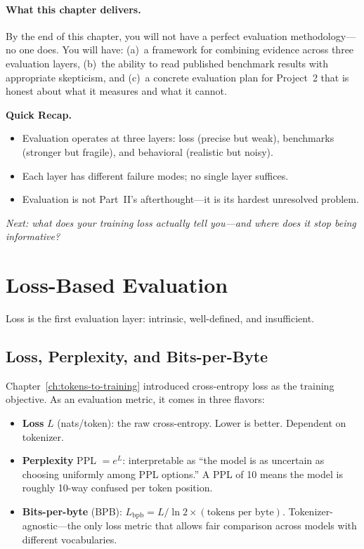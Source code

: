 \paragraph{What this chapter delivers.} By the end of this chapter, you will not have a perfect evaluation methodology---no one does. You will have: (a)~a framework for combining evidence across three evaluation layers, (b)~the ability to read published benchmark results with appropriate skepticism, and (c)~a concrete evaluation plan for Project~2 that is honest about what it measures and what it cannot.

\begin{quickrecap}
\textbf{Quick Recap.}
\begin{itemize}[nosep,leftmargin=1.5em]
  \item Evaluation operates at three layers: loss (precise but weak), benchmarks (stronger but fragile), and behavioral (realistic but noisy).
  \item Each layer has different failure modes; no single layer suffices.
  \item Evaluation is not Part~II's afterthought---it is its hardest unresolved problem.
\end{itemize}
\textit{Next: what does your training loss actually tell you---and where does it stop being informative?}
\end{quickrecap}


\section{Loss-Based Evaluation}
\label{sec:loss-eval}

Loss is the first evaluation layer: intrinsic, well-defined, and insufficient.

\subsection{Loss, Perplexity, and Bits-per-Byte}

Chapter~\ref{ch:tokens-to-training} introduced cross-entropy loss as the training objective. As an evaluation metric, it comes in three flavors:

\begin{itemize}[nosep]
  \item \textbf{Loss} $L$ (nats/token): the raw cross-entropy. Lower is better. Dependent on tokenizer.
  \item \textbf{Perplexity} PPL $= e^L$: interpretable as ``the model is as uncertain as choosing uniformly among PPL options.'' A PPL of 10 means the model is roughly 10-way confused per token position.
  \item \textbf{Bits-per-byte} (BPB): $L_{\text{bpb}} = L / \ln 2 \times (\text{tokens per byte})$. Tokenizer-agnostic---the only loss metric that allows fair comparison across models with different vocabularies.
\end{itemize}

